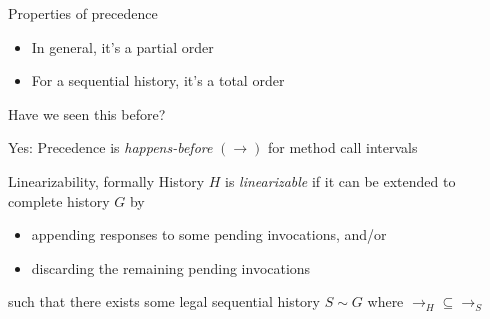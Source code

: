 \documentclass{beamer}
\begin{document}
\begin{frame}{Properties of precedence}{}
  \begin{itemize}
    \item In general, it’s a partial order
    \item For a sequential history, it’s a total order
  \end{itemize}
  Have we seen this before?

  \pause
  Yes: Precedence is \emph{happens-before} $(\to)$ for method call
  intervals
\end{frame}

\begin{frame}{Linearizability, formally}
  History $H$ is \emph{linearizable} if it can be extended to complete
  history $G$ by
  \begin{itemize}
    \item appending responses to some pending invocations, and/or
    \item discarding the remaining pending invocations
  \end{itemize}
  such that there exists some legal sequential history $S \sim G$ where
  ${\to_H} \subseteq {\to_S}$
\end{frame}
\end{document}
